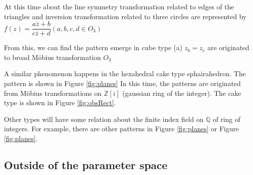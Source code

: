 \documentclass[suppldata, dvipdfmx]{interact}
\theoremstyle{plain}%
\theoremstyle{definition}
\theoremstyle{remark}
\theoremstyle{problemstyle}
\begin{document}
At this time about the line symmetry transformation related to edges of
the triangles and inversion transformation related to three circles 
are represented by
$f(z) = \dfrac{a\overline{z} + b}{c\overline{z}+ d} (a, b, c, d \in O_3)$

From this, we can find the pattern emerge in cube type (a) $z_b = z_c$
are originated to broad M\"obius transformation $O_3$

A similar phenomenon happens in the hexahedral cake type sphairahedron.
The pattern is shown in Figure \ref{fig:planes}
In this time, the patterns are originated from M\"obius transformations
on $\mathbb{Z}[i]$ (gaussian ring of the integer).
The cake type is shown in Figure \ref{fig:obsRect}.

Other types will have some relation about the finite index field on
 $\mathbb{Q}$ of ring of integers.
For example, there are other patterns in Figure
 \ref{fig:planes} or
 Figure \ref{fig:planes}.

\subsection{Outside of the parameter space}
\end{document}
